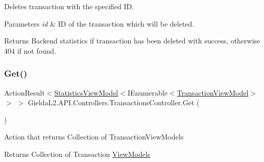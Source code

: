 Deletes transaction with the specified ID. 


\begin{DoxyParams}{Parameters}
{\em id} & ID of the transaction which will be deleted.\\
\hline
\end{DoxyParams}
\begin{DoxyReturn}{Returns}
Backend statistics if transaction has been deleted with success, otherwise 404 if not found.
\end{DoxyReturn}
\mbox{\label{class_gielda_l2_1_1_a_p_i_1_1_controllers_1_1_transactions_controller_a6f3816a2e97328c17ff0aff554c476ad}} 
\subsubsection{\texorpdfstring{Get()}{Get()}\hspace{0.1cm}{\footnotesize\ttfamily [1/2]}}
{\footnotesize\ttfamily Action\+Result$<$\mbox{\hyperlink{class_gielda_l2_1_1_a_p_i_1_1_view_models_1_1_view_1_1_statistics_view_model}{Statistics\+View\+Model}}$<$I\+Enumerable$<$\mbox{\hyperlink{class_gielda_l2_1_1_a_p_i_1_1_view_models_1_1_view_1_1_transaction_view_model}{Transaction\+View\+Model}}$>$ $>$ $>$ Gielda\+L2.\+A\+P\+I.\+Controllers.\+Transactions\+Controller.\+Get (\begin{DoxyParamCaption}{ }\end{DoxyParamCaption})}



Action that returns Collection of Transaction\+View\+Models 

\begin{DoxyReturn}{Returns}
Collection of Transaction \mbox{\hyperlink{namespace_gielda_l2_1_1_a_p_i_1_1_view_models}{View\+Models}}
\end{DoxyReturn}
\mbox{\label{class_gielda_l2_1_1_a_p_i_1_1_controllers_1_1_transactions_controller_a2bd1feea8d75f19e65ccf986a1d65300}} 
